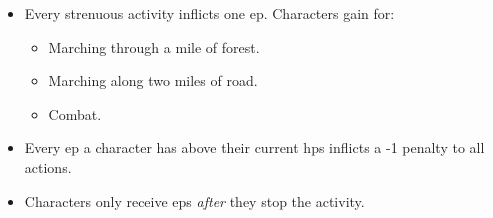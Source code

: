 \begin{itemize}
  \item
  Every strenuous activity inflicts one \gls{ep}.
  Characters gain  for:
  \begin{itemize}
    \item
    Marching through a mile of forest.
    \item
    Marching along two miles of road.
    \item
    Combat.
  \end{itemize}
  \item
  Every \gls{ep} a character has above their current \glspl{hp} inflicts a -1 penalty to all actions.
  \item
  Characters only receive \glspl{ep} \emph{after} they stop the activity.
\end{itemize}

